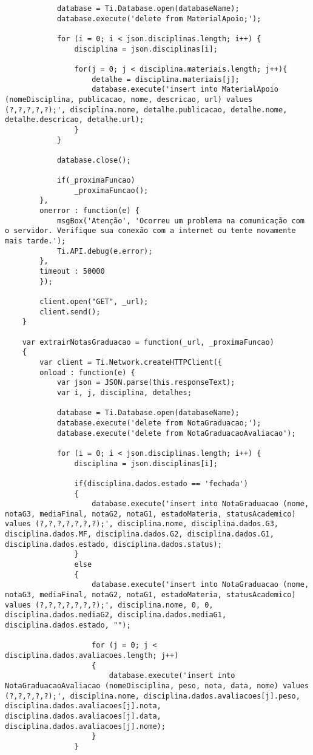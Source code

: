 \begin{lstlisting}
			database = Ti.Database.open(databaseName);
			database.execute('delete from MaterialApoio;');
			
			for (i = 0; i < json.disciplinas.length; i++) {
				disciplina = json.disciplinas[i];

				for(j = 0; j < disciplina.materiais.length; j++){
					detalhe = disciplina.materiais[j];
					database.execute('insert into MaterialApoio (nomeDisciplina, publicacao, nome, descricao, url) values (?,?,?,?,?);', disciplina.nome, detalhe.publicacao, detalhe.nome, detalhe.descricao, detalhe.url);
				}
			}
			
			database.close();
			
     		if(_proximaFuncao)	
     			_proximaFuncao();         			
    	},
     	onerror : function(e) {
     		msgBox('Atenção', 'Ocorreu um problema na comunicação com o servidor. Verifique sua conexão com a internet ou tente novamente mais tarde.');
         	Ti.API.debug(e.error);
    	},
     	timeout : 50000 
 		});
 	
		client.open("GET", _url);
 		client.send();  
 	}
 	
 	var extrairNotasGraduacao = function(_url, _proximaFuncao)
 	{
 		var client = Ti.Network.createHTTPClient({
    	onload : function(e) {
    		var json = JSON.parse(this.responseText);
			var i, j, disciplina, detalhes;
			
			database = Ti.Database.open(databaseName);
			database.execute('delete from NotaGraduacao;');
			database.execute('delete from NotaGraduacaoAvaliacao');
			
			for (i = 0; i < json.disciplinas.length; i++) {
				disciplina = json.disciplinas[i];

				if(disciplina.dados.estado == 'fechada')
				{
					database.execute('insert into NotaGraduacao (nome, notaG3, mediaFinal, notaG2, notaG1, estadoMateria, statusAcademico) values (?,?,?,?,?,?,?);', disciplina.nome, disciplina.dados.G3, disciplina.dados.MF, disciplina.dados.G2, disciplina.dados.G1, disciplina.dados.estado, disciplina.dados.status);
				}
				else
				{
					database.execute('insert into NotaGraduacao (nome, notaG3, mediaFinal, notaG2, notaG1, estadoMateria, statusAcademico) values (?,?,?,?,?,?,?);', disciplina.nome, 0, 0, disciplina.dados.mediaG2, disciplina.dados.mediaG1, disciplina.dados.estado, "");
					
					for (j = 0; j < disciplina.dados.avaliacoes.length; j++)
					{
						database.execute('insert into NotaGraduacaoAvaliacao (nomeDisciplina, peso, nota, data, nome) values (?,?,?,?,?);', disciplina.nome, disciplina.dados.avaliacoes[j].peso, disciplina.dados.avaliacoes[j].nota, disciplina.dados.avaliacoes[j].data, disciplina.dados.avaliacoes[j].nome);
					}
				}
				

\end{lstlisting}
